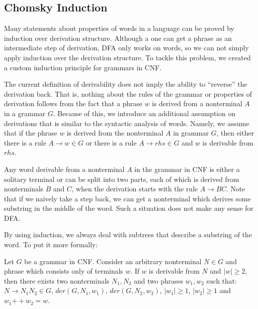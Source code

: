 \subsection{Chomsky Induction}
\label{sec:chomsky-induction}

Many statements about properties of words in a language can be proved by induction over derivation structure.
Although a one can get a phrase as an intermediate step of derivation, DFA only works on words, so we can not simply apply induction over the derivation structure. To tackle this problem, we created a custom induction principle for grammars in CNF.

The current definition of derivability does not imply the ability to ``reverse'' the derivation back. That is, nothing about the rules of the grammar or properties of derivation follows from the fact that a phrase $w$ is derived from a nonterminal $A$ in a grammar $G$. Because of this, we introduce an additional assumption on derivations that is similar to the syntactic analysis of words.
Namely, we assume that if the phrase $w$ is derived from the nonterminal $A$ in grammar $G$, then either there is a rule $A \to w \in G$ or there is a rule $A \to rhs \in G$ and $w$ is derivable from $rhs$.



Any word derivable from a nonterminal $A$ in the grammar in CNF is either a solitary terminal or can be split into two parts, each of which is derived from nonterminals $B$ and $C$, when the derivation starts with the rule $A \to B C$.
Note that if we naively take a step back, we can get a nonterminal which derives some substring in the middle of the word.
Such a situation does not make any sense for DFA.

By using induction, we always deal with subtrees that describe a substring of the word.
%
To put it more formally:
\begin{lemma} \label{lemma:chomskyind1}
Let $G$ be a grammar in CNF. Consider an arbitrary nonterminal $N \in G$ and phrase which consists only of terminals $w$.
If $w$ is derivable from $N$ and $|w| \ge 2$, then there exists two nonterminals $N_1, N_2$ and two phrases $w_1, w_2$ such that: $N \to N_1 N_2 \in G$, $der(G, N_1, w_1)$, $der(G, N_2, w_2)$, $|w_1| \ge 1$, $|w_2| \ge 1$ and $w_1 \mathbin{++} w_2 = w$.
\end{lemma}


